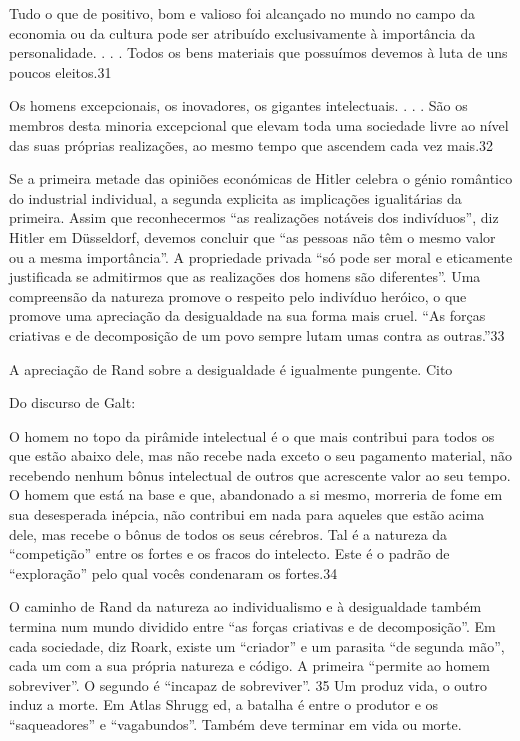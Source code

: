  \par 
Tudo o que de positivo, bom e valioso foi alcançado no mundo no campo da economia ou da cultura pode ser atribuído exclusivamente à importância da personalidade. . . . Todos os bens materiais que possuímos devemos à luta de uns poucos eleitos.{\color{blue}31}
 \par 
Os homens excepcionais, os inovadores, os gigantes intelectuais. . . . São os membros desta minoria excepcional que elevam toda uma sociedade livre ao nível das suas próprias realizações, ao mesmo tempo que ascendem cada vez mais.{\color{blue}32}
 \par 
Se a primeira metade das opiniões económicas de Hitler celebra o génio romântico do industrial individual, a segunda explicita as implicações igualitárias da primeira. Assim que reconhecermos “as realizações notáveis ​​dos indivíduos”, diz Hitler em Düsseldorf, devemos concluir que “as pessoas não têm o mesmo valor ou a mesma importância”. A propriedade privada “só pode ser moral e eticamente justificada se admitirmos que as realizações dos homens são diferentes”. Uma compreensão da natureza promove o respeito pelo indivíduo heróico, o que promove uma apreciação da desigualdade na sua forma mais cruel. “As forças criativas e de decomposição de um povo sempre lutam umas contra as outras.”{\color{blue}33}
 \par 
A apreciação de Rand sobre a desigualdade é igualmente pungente. Cito
 \par 
Do discurso de Galt:
 \par 
O homem no topo da pirâmide intelectual é o que mais contribui para todos os que estão abaixo dele, mas não recebe nada exceto o seu pagamento material, não recebendo nenhum bônus intelectual de outros que acrescente valor ao seu tempo. O homem que está na base e que, abandonado a si mesmo, morreria de fome em sua desesperada inépcia, não contribui em nada para aqueles que estão acima dele, mas recebe o bônus de todos os seus cérebros. Tal é a natureza da “competição” entre os fortes e os fracos do intelecto. Este é o padrão de “exploração” pelo qual vocês condenaram os fortes.{\color{blue}34}
 \par 
O caminho de Rand da natureza ao individualismo e à desigualdade também termina num mundo dividido entre “as forças criativas e de decomposição”. Em cada sociedade, diz Roark, existe um “criador” e um parasita “de segunda mão”, cada um com a sua própria natureza e código. A primeira “permite ao homem sobreviver”. O segundo é “incapaz de sobreviver”. {\color{blue}35} Um produz vida, o outro induz a morte. Em Atlas Shrugg ed, a batalha é entre o produtor e os “saqueadores” e “vagabundos”. Também deve terminar em vida ou morte.
